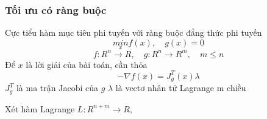 \subsubsection{Tối ưu có ràng buộc}
Cực tiểu hàm mục tiêu phi tuyến với ràng buộc đẳng thức phi tuyến
\begin{equation*}
    \underset{x}{min} f(x) , \quad g(x) = 0
\end{equation*}
\begin{equation*}
    f: {R}^n \rightarrow {R}, \quad g: {R}^n \rightarrow {R}^m, \quad m \leq     n
\end{equation*}
Để $x$ là lời giải của bài toán, cần thỏa
\begin{equation*}
    -\nabla f(x) = J^T_g(x)\lambda
\end{equation*}
$J^T_g$ là ma trận Jacobi của $g$
$\lambda$ là vectơ nhân tử Lagrange m chiều

Xét hàm Lagrange $L: R^{n+m}\rightarrow R$,



































